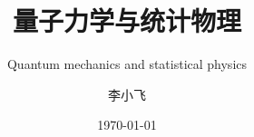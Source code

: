 \documentclass[12pt,hyperref,UTF8,aspectratio=169]{beamer}
\begin{document}

\author{\myfont 李小飞}
\title{\textbf{\Huge 量子力学与统计物理}}
\subtitle{Quantum mechanics and statistical physics}
\date{\today}


\maketitle


% 
%
\end{document}
